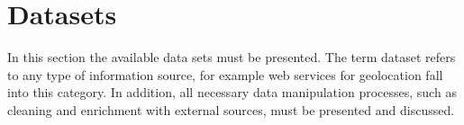 \section{Datasets}
In this section the available data sets must be presented.
The term dataset refers to any type of information source, for example web services for geolocation fall into this category.
In addition, all necessary data manipulation processes, such as cleaning and enrichment with external sources, must be presented and discussed.
